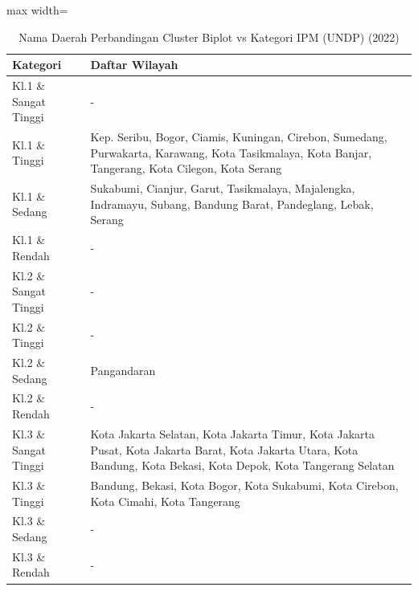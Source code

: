 \begin{table}[H]
\centering
\caption{Nama Daerah Perbandingan Cluster Biplot vs Kategori IPM (UNDP) (2022)} \label{tab:crossname2022}
\begin{adjustbox}{max width=\textwidth}
\begin{tabular}{|p{4cm}|p{10cm}|}
\hline
\textbf{Kategori} & \textbf{Daftar Wilayah} \\
\hline
Kl.1 \& Sangat Tinggi & - \\
\hline
Kl.1 \& Tinggi & Kep. Seribu, Bogor, Ciamis, Kuningan, Cirebon, Sumedang, Purwakarta, Karawang, Kota Tasikmalaya, Kota Banjar, Tangerang, Kota Cilegon, Kota Serang \\
\hline
Kl.1 \& Sedang & Sukabumi, Cianjur, Garut, Tasikmalaya, Majalengka, Indramayu, Subang, Bandung Barat, Pandeglang, Lebak, Serang \\
\hline
Kl.1 \& Rendah & - \\
\hline
Kl.2 \& Sangat Tinggi & - \\
\hline
Kl.2 \& Tinggi & - \\
\hline
Kl.2 \& Sedang & Pangandaran \\
\hline
Kl.2 \& Rendah & - \\
\hline
Kl.3 \& Sangat Tinggi & Kota Jakarta Selatan, Kota Jakarta Timur, Kota Jakarta Pusat, Kota Jakarta Barat, Kota Jakarta Utara, Kota Bandung, Kota Bekasi, Kota Depok, Kota Tangerang Selatan \\
\hline
Kl.3 \& Tinggi & Bandung, Bekasi, Kota Bogor, Kota Sukabumi, Kota Cirebon, Kota Cimahi, Kota Tangerang \\
\hline
Kl.3 \& Sedang & - \\
\hline
Kl.3 \& Rendah & - \\
\hline
\end{tabular}
\end{adjustbox}
\end{table}